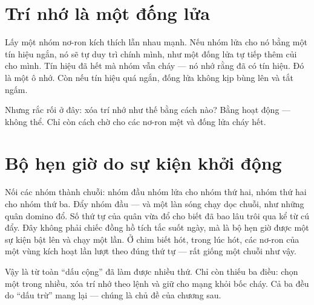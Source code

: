 
\section*{Trí nhớ là một đống lửa}

Lấy một nhóm nơ-ron kích thích lẫn nhau mạnh. Nếu nhóm lửa cho nó bằng một tín hiệu ngắn, nó sẽ tự duy trì chính mình, như một đống lửa tự tiếp thêm củi cho mình. Tín hiệu đã hết mà nhóm vẫn cháy --- nó nhớ rằng đã có tín hiệu. Đó là một ô nhớ. Còn nếu tín hiệu quá ngắn, đống lửa không kịp bùng lên và tắt ngấm.

Nhưng rắc rối ở đây: xóa trí nhớ như thế bằng cách nào? Bằng hoạt động --- không thể. Chỉ còn cách chờ cho các nơ-ron mệt và đống lửa cháy hết.

\section*{Bộ hẹn giờ do sự kiện khởi động}

Nối các nhóm thành chuỗi: nhóm đầu nhóm lửa cho nhóm thứ hai, nhóm thứ hai cho nhóm thứ ba. Đẩy nhóm đầu --- và một làn sóng chạy dọc chuỗi, như những quân domino đổ. Số thứ tự của quân vừa đổ cho biết đã bao lâu trôi qua kể từ cú đẩy. Đây không phải chiếc đồng hồ tích tắc suốt ngày, mà là bộ hẹn giờ được một sự kiện bật lên và chạy một lần. Ở chim biết hót, trong lúc hót, các nơ-ron của một vùng kích hoạt lần lượt theo đúng thứ tự --- rất giống một chuỗi như vậy.

Vậy là từ toàn ``dấu cộng'' đã làm được nhiều thứ. Chỉ còn thiếu ba điều: chọn một trong nhiều, xóa trí nhớ theo lệnh và giữ cho mạng khỏi bốc cháy. Cả ba đều do ``dấu trừ'' mang lại --- chúng là chủ đề của chương sau.

